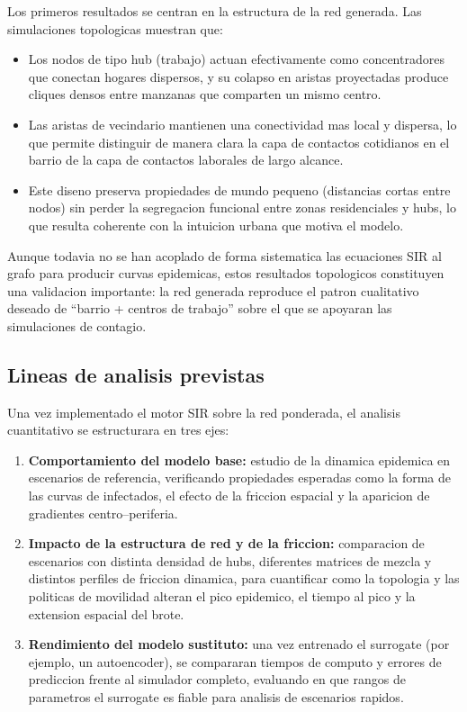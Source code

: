 Los primeros resultados se centran en la estructura de la red generada. Las simulaciones topologicas muestran que:

\begin{itemize}
    \item Los nodos de tipo hub (trabajo) actuan efectivamente como concentradores que conectan hogares dispersos, y su colapso en aristas proyectadas produce cliques densos entre manzanas que comparten un mismo centro.
    \item Las aristas de vecindario mantienen una conectividad mas local y dispersa, lo que permite distinguir de manera clara la capa de contactos cotidianos en el barrio de la capa de contactos laborales de largo alcance.
    \item Este diseno preserva propiedades de mundo pequeno (distancias cortas entre nodos) sin perder la segregacion funcional entre zonas residenciales y hubs, lo que resulta coherente con la intuicion urbana que motiva el modelo.
\end{itemize}

Aunque todavia no se han acoplado de forma sistematica las ecuaciones SIR al grafo para producir curvas epidemicas, estos resultados topologicos constituyen una validacion importante: la red generada reproduce el patron cualitativo deseado de “barrio + centros de trabajo” sobre el que se apoyaran las simulaciones de contagio.

\subsection{Lineas de analisis previstas}

Una vez implementado el motor SIR sobre la red ponderada, el analisis cuantitativo se estructurara en tres ejes:

\begin{enumerate}
    \item \textbf{Comportamiento del modelo base:} estudio de la dinamica epidemica en escenarios de referencia, verificando propiedades esperadas como la forma de las curvas de infectados, el efecto de la friccion espacial y la aparicion de gradientes centro–periferia.
    \item \textbf{Impacto de la estructura de red y de la friccion:} comparacion de escenarios con distinta densidad de hubs, diferentes matrices de mezcla y distintos perfiles de friccion dinamica, para cuantificar como la topologia y las politicas de movilidad alteran el pico epidemico, el tiempo al pico y la extension espacial del brote.
    \item \textbf{Rendimiento del modelo sustituto:} una vez entrenado el surrogate (por ejemplo, un autoencoder), se compararan tiempos de computo y errores de prediccion frente al simulador completo, evaluando en que rangos de parametros el surrogate es fiable para analisis de escenarios rapidos.
\end{enumerate}

